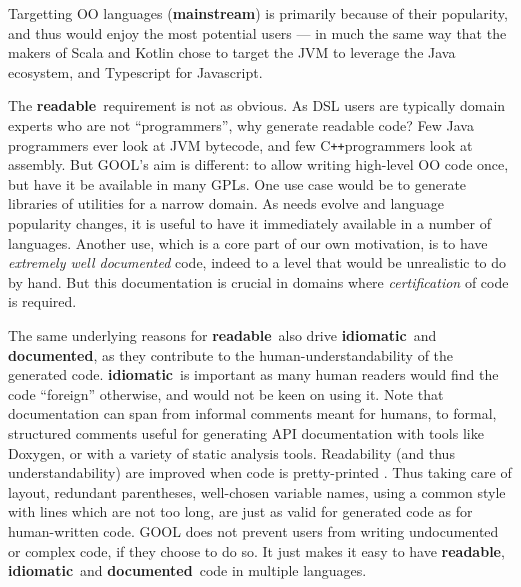 \documentclass[sigplan,review,anonymous,prologue,dvipsnames]{acmart}
\newcommand{\Cplusplus}{C\texttt{++}}
\newcommand{\abbrev}[1]{\textbf{#1}}
\newcommand{\mainstream}{\abbrev{mainstream}}
\newcommand{\readable}{\abbrev{readable}}
\newcommand{\idiomatic}{\abbrev{idiomatic}}
\newcommand{\documented}{\abbrev{documented}}
\begin{document}
Targetting OO languages (\mainstream) is primarily because of their popularity, and thus
would enjoy the most potential users --- in much the same way that the makers
of Scala and Kotlin chose to target the JVM to leverage the Java ecosystem, and
Typescript for Javascript.

The \readable~requirement is not as obvious. As DSL users are typically
domain experts who are not ``programmers'', why generate readable code?
Few Java programmers ever look at JVM bytecode, and few \Cplusplus programmers
look at assembly. But GOOL's aim is different: to allow writing
high-level OO code once, but have it be available in many GPLs. One use case
would be to generate libraries of utilities for a narrow domain. As needs
evolve and language popularity changes, it is useful to have it immediately
available in a number of languages. Another use, which is a core part of our
own motivation, is to have \emph{extremely well documented} code, indeed to
a level that would be unrealistic to do by hand. But this documentation is
crucial in domains where \emph{certification} of code is required.

The same underlying reasons for \readable~also drive \idiomatic~and \documented,
as they contribute to the human-understandability of the generated code.
\idiomatic~is important as many human readers would find the code ``foreign''
otherwise, and would not be keen on using it.
Note that documentation can span from informal comments meant for humans, to
formal, structured comments useful for generating API documentation with tools
like Doxygen, or with a variety of static analysis tools.
Readability (and thus understandability) are improved when code is pretty-printed%
\cite{buse2009learning}. Thus taking care of layout, redundant parentheses,
well-chosen variable names, using a common style with lines which are not too
long, are just as valid for generated code as for human-written code.
GOOL does not prevent users from writing undocumented or complex code, if they
choose to do so. It just makes it easy to have \readable, \idiomatic~and
\documented~code in multiple languages.
\end{document}
